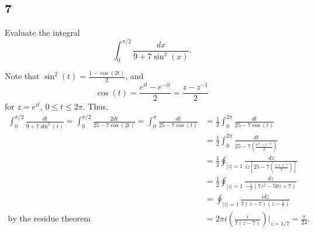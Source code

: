 \documentclass[12pt]{article}
\begin{document}
\subsection*{7}
\begin{tcolorbox}
Evaluate the integral 
\[ \int_{0}^{\pi/2}\frac{dx}{9 + 7\sin^{2}(x)}. \]
\end{tcolorbox}
Note that $\sin^2(t) = \frac{1 - \cos(2t)}{2}$, and 
\[ \cos(t) = \frac{e^{it} - e^{-it}}{2} = \frac{z - z^{-1}}{2} \]
for $z = e^{it}$, $0 \leq t \leq 2\pi$. Thus,
\begin{align*}
\int_{0}^{\pi/2}\frac{dt}{9 + 7\sin^2(t)} = \int_{0}^{\pi/2}\frac{2dt}{25 - 7\cos(2t)} = \int_{0}^{\pi}\frac{dt}{25 - 7\cos(t)} & =
\frac{1}{2}\int_{0}^{2\pi}\frac{dt}{25 - 7\cos(t)} \\
& = \frac{1}{2}\int_{0}^{2\pi}\frac{dt}{25 - 7\left( \frac{e^{it} - e^{-it}}{2} \right)} \\
& = \frac{1}{2}\oint_{|z| = 1}\frac{dz}{iz\left[ 25 - 7\left( \frac{z + z^{-1}}{2} \right) \right]} \\
& = \frac{1}{2}\oint_{|z| = 1}\frac{dz}{-\frac{i}{2}(7z^2 - 50z + 7)} \\
& = \oint_{|z| = 1}\frac{idz}{7(z - 7)(z - \frac{1}{7})} \\
\text{by the residue theorem } \qquad & = 2\pi i \left( \frac{i}{7(z - 7)} \right)\bigg|_{z = 1/7} = \frac{\pi}{24}.
\end{align*}




\newpage 
\end{document}
